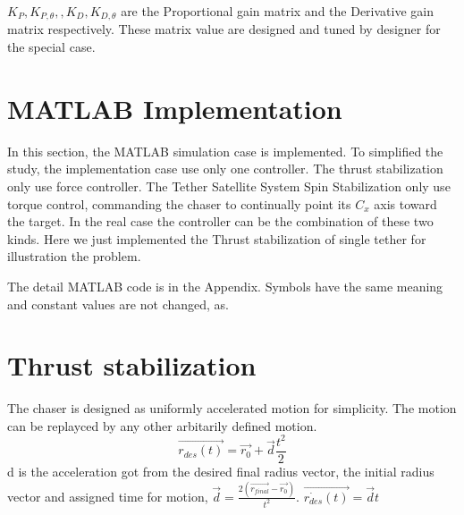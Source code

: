 $K_P,K_{P,\theta},, K_D,K_{D,\theta}$ are the Proportional gain matrix and the Derivative gain matrix respectively. These matrix value are designed and tuned by designer for the special case.

\section{MATLAB Implementation}
In this section, the MATLAB simulation case is implemented. To simplified the study, the implementation case use only one controller. The thrust stabilization only use force controller. The Tether Satellite System Spin Stabilization only use torque control, commanding the chaser to continually point its $C_x$  axis toward the target. In the real case the controller can be the combination of these two kinds. Here we just implemented the Thrust stabilization of single tether for illustration the problem.

The detail MATLAB code is in the Appendix. Symbols have the same meaning and constant values are not changed, as\cite{hovell2017experimental}. 

\section{Thrust stabilization}

The chaser is designed as uniformly accelerated motion for simplicity. The motion can be replayced by any other arbitarily defined motion. $$\overrightarrow{r_{des}(t)}=\overrightarrow{r_0}+\overrightarrow{d}\frac{t^2}{2}$$ d is the acceleration got from the desired final radius vector, the initial radius vector and assigned time for motion, $\overrightarrow{d} = \frac{2(\overrightarrow{r_{final}}-\overrightarrow{r_0})}{t^2}$.
$\overrightarrow{\dot{r_{des}}(t)}=\overrightarrow{d}t$ 


